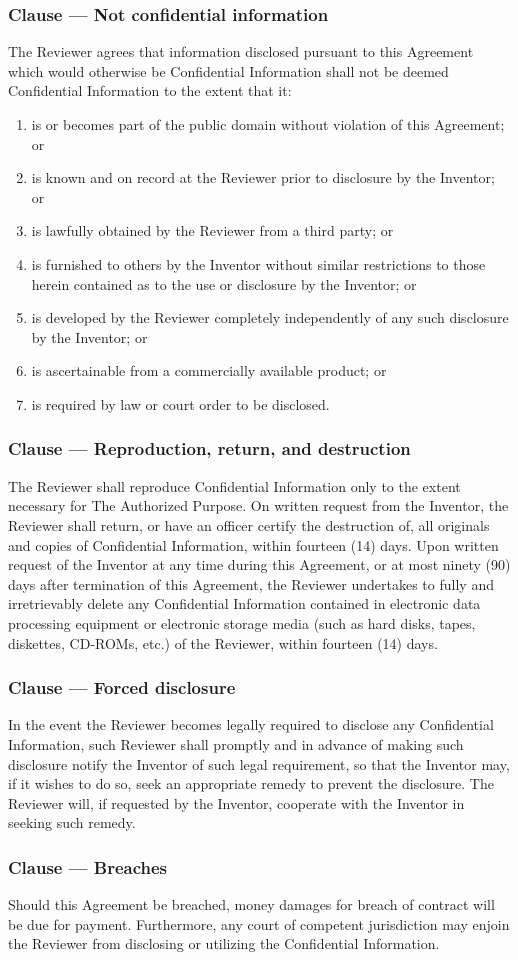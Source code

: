 \documentclass[a4paper]{article}
\newcounter{clausenr}
\newcommand{\clause}[1]{\addtocounter{clausenr}{1}\subsubsection{Clause \Roman{clausenr} --- #1}}
\begin{document}
\clause{Not confidential information}
The Reviewer agrees that information disclosed pursuant to this Agreement which would otherwise be
Confidential Information shall not be deemed Confidential Information to the extent that it:
\begin{enumerate}
\item is or becomes part of the public domain without violation of this Agreement; or
\item is known and on record at the Reviewer prior to disclosure by the Inventor; or
\item is lawfully obtained by the Reviewer from a third party; or
\item is furnished to others by the Inventor without similar restrictions to those herein contained as to the use or disclosure by the Inventor; or
\item is developed by the Reviewer completely independently of any such disclosure by the Inventor; or
\item is ascertainable from a commercially available product; or
\item is required by law or court order to be disclosed.
\end{enumerate}

\clause{Reproduction, return, and destruction}
The Reviewer shall reproduce Confidential Information only to the extent necessary for The Authorized Purpose.
On written request from the Inventor,
the Reviewer shall return,
or have an officer certify the destruction of,
all originals and copies of Confidential Information,
within fourteen (14) days.
Upon written request of the Inventor at any time during this Agreement,
or at most ninety (90) days after termination of this Agreement,
the Reviewer undertakes to fully and irretrievably delete any Confidential Information contained
in electronic data processing equipment or electronic storage media
(such as hard disks, tapes, diskettes, CD-ROMs, etc.)
of the Reviewer,
within fourteen (14) days.

\clause{Forced disclosure}
In the event the Reviewer becomes legally required to disclose any Confidential Information,
such Reviewer shall promptly and in advance of making such disclosure notify the Inventor of such legal requirement,
so that the Inventor may,
if it wishes to do so,
seek an appropriate remedy to prevent the disclosure.
The Reviewer will,
if requested by the Inventor,
cooperate with the Inventor in seeking such remedy.

\clause{Breaches}
Should this Agreement be breached,
money damages for breach of contract will be due for payment.
Furthermore,
any court of competent jurisdiction may enjoin the Reviewer from disclosing or utilizing the Confidential Information.
\end{document}
